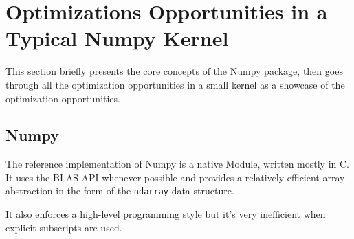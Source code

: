 \documentclass[10pt, preprint, nocopyrightspace]{sigplanconf}
\begin{document}


\section{Optimizations Opportunities in a Typical Numpy Kernel}
\label{sec:optimize}

This section briefly presents the core concepts of the Numpy package, then goes
through all the optimization opportunities in a small kernel as a showcase of
the optimization opportunities.

\subsection{Numpy}

The reference implementation of Numpy is a native Module, written mostly in C.
It uses the BLAS API whenever possible and provides a relatively efficient array
abstraction in the form of the \texttt{ndarray} data structure.


It also enforces a high-level programming style but it's very inefficient when
explicit subscripts are used. 
\end{document}
